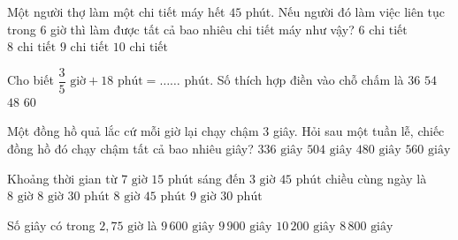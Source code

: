 \begin{ex} %
Một người thợ làm một chi tiết máy hết $45$ phút. Nếu người đó làm việc liên tục trong $6$ giờ thì làm được tất cả bao nhiêu chi tiết máy như vậy?
\choice
{$6\text{ chi tiết}$}
{\True $8\text{ chi tiết}$}
{$9\text{ chi tiết}$}
{$10\text{ chi tiết}$}
\end{ex}

\begin{ex} %
Cho biết $\dfrac{3}{5}\text{ giờ} + 18\text{ phút} = \ldots\ldots\text{ phút}$. Số thích hợp điền vào chỗ chấm là
\choice
{$36$}
{\True $54$}
{$48$}
{$60$}
\end{ex}

\begin{ex} %
Một đồng hồ quả lắc cứ mỗi giờ lại chạy chậm $3$ giây. Hỏi sau một tuần lễ, chiếc đồng hồ đó chạy chậm tất cả bao nhiêu giây?
\choice
{$336\text{ giây}$}
{\True $504\text{ giây}$}
{$480\text{ giây}$}
{$560\text{ giây}$}
\end{ex}

\begin{ex} %
Khoảng thời gian từ $7\text{ giờ } 15\text{ phút}$ sáng đến $3\text{ giờ } 45\text{ phút}$ chiều cùng ngày là
\choice
{$8\text{ giờ}$}
{\True $8\text{ giờ } 30\text{ phút}$}
{$8\text{ giờ } 45\text{ phút}$}
{$9\text{ giờ } 30\text{ phút}$}
\end{ex}

\begin{ex} %
Số giây có trong $2{,}75\text{ giờ}$ là
\choice
{$9\,600\text{ giây}$}
{\True $9\,900\text{ giây}$}
{$10\,200\text{ giây}$}
{$8\,800\text{ giây}$}
\end{ex}


